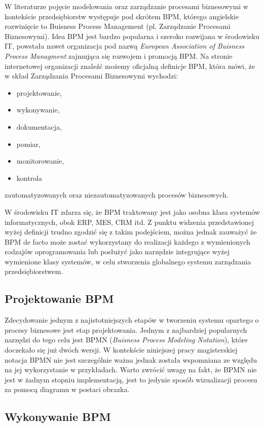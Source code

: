 W literaturze pojęcie modelowania oraz zarządzanie procesami biznesowymi w kontekście przedsiębiorstw występuje pod skrótem BPM, którego angielskie rozwinięcie to Buisness Process Management (pl.  Zarządzanie Procesami Biznesowymi). Idea BPM jest bardzo popularna i szeroko rozwijana w środowisku IT, powstała nawet organizacja pod nazwą \textit{European Association of Buisness Process Managment} zajmująca się rozwojem i promocją BPM.  Na stronie internetowej organizacji znaleźć możemy oficjalną definicje BPM, która mówi, że w skład Zarządzania Procesami Biznesowymi wychodzi:
\begin{itemize}
\item projektowanie,
\item wykonywanie,
\item dokumentacja,
\item pomiar,
\item monitorowanie,
\item kontrola
\end{itemize}
zautomatyzowanych oraz niezautomatyzowanych procesów biznesowych.~\cite{EAOBPMWeb}

W środowisku IT zdarza się, że BPM traktowany jest jako osobna klasa systemów informatycznych, obok ERP, MES, CRM itd. Z punktu widzenia przedstawionej wyżej definicji trudno zgodzić się z takim podejściem, można jednak zauważyć że BPM de facto może zostać wykorzystany do realizacji każdego z wymienionych rodzajów oprogramowania lub posłużyć jako narzędzie integrujące wyżej wymienione klasy systemów, w celu stworzenia globalnego systemu zarządzania przedsiębiorstwem. ~\cite{wiBPMA}

\subsection{Projektowanie BPM}
\label{sec:projektowanieBPM}

Zdecydowanie jednym z najistotniejszych etapów w tworzeniu systemu opartego o procesy biznesowe jest etap projektowania. Jednym z najbardziej popularnych narzędzi do tego celu jest BPMN (\textit{Buisness Process Modeling Notation}), które doczekało się już dwóch wersji. W kontekście niniejszej pracy magisterskiej notacja BPMN nie jest szczególnie ważna jednak została wspomniana ze względu na jej wykorzystanie w przykładach. Warto zwrócić uwagę  na fakt, że BPMN nie jest w żadnym stopniu implementacją, jest to jedynie sposób wizualizacji procesu za pomocą diagramu w postaci obrazka.

\subsection{Wykonywanie BPM}
\label{sec:wykonywanieBPM}

